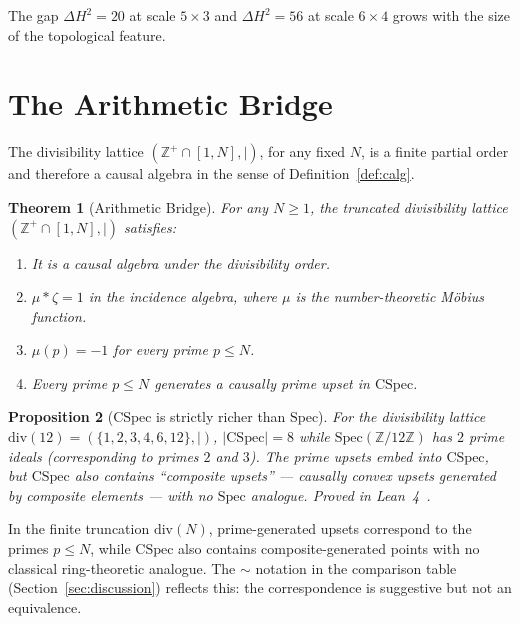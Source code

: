 \documentclass[11pt,a4paper]{article}
\theoremstyle{plain}
\newtheorem{theorem}{Theorem}[section]
\newtheorem{proposition}[theorem]{Proposition}
\theoremstyle{definition}
\theoremstyle{remark}
\newcommand{\CSpec}{\mathrm{CSpec}}
\newcommand{\Spec}{\mathrm{Spec}}
\newcommand{\Z}{\mathbb{Z}}
\begin{document}
\noindent The gap $\Delta H^2 = 20$ at scale $5 \times 3$ and $\Delta H^2 = 56$ at scale $6 \times 4$ grows with the size of the topological feature.


\section{The Arithmetic Bridge}\label{sec:arithmetic}

The divisibility lattice $(\Z^+ \cap [1,N], \mid)$, for any fixed $N$, is a finite partial order and therefore a causal algebra in the sense of Definition~\ref{def:calg}.

\begin{theorem}[Arithmetic Bridge]\label{thm:bridge}
For any $N \geq 1$, the truncated divisibility lattice $(\Z^+ \cap [1,N], \mid)$ satisfies:
\begin{enumerate}[nosep]
\item It is a causal algebra under the divisibility order.
\item $\mu * \zeta = 1$ in the incidence algebra, where $\mu$ is the number-theoretic M\"obius function.
\item $\mu(p) = -1$ for every prime $p \leq N$.
\item Every prime $p \leq N$ generates a causally prime upset in $\CSpec$.
\end{enumerate}
\end{theorem}

\begin{proposition}[$\CSpec$ is strictly richer than $\Spec$]\label{prop:cspec_richer}
For the divisibility lattice $\mathrm{div}(12) = (\{1,2,3,4,6,12\}, \mid)$,
$|\CSpec| = 8$ while $\Spec(\Z/12\Z)$ has $2$ prime ideals (corresponding
to primes $2$ and $3$). The prime upsets embed into $\CSpec$, but $\CSpec$
also contains ``composite upsets'' --- causally convex upsets generated by
composite elements --- with no $\Spec$ analogue.
Proved in Lean~4~\cite{leanrepo}.
\end{proposition}

\noindent In the finite truncation $\mathrm{div}(N)$, prime-generated
upsets correspond to the primes $p \leq N$, while $\CSpec$ also
contains composite-generated points with no classical ring-theoretic
analogue. The $\sim$ notation in the comparison table
(Section~\ref{sec:discussion}) reflects this: the correspondence is
suggestive but not an equivalence.
\end{document}

